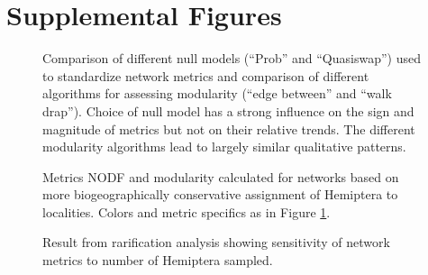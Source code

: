 % 
% 

\clearpage

\section*{Supplemental Figures}

\begin{figure}[!hp]
  \centering
  \caption[Comparison of different null models]{Comparison of
    different null models (``Prob'' and ``Quasiswap'') used to
    standardize network metrics and comparison of different algorithms
    for assessing modularity (``edge between'' and ``walk
    drap''). Choice of null model has a strong influence on the sign
    and magnitude of metrics but not on their relative trends. The
    different modularity algorithms lead to largely similar
    qualitative patterns.}
  \label{figSupp:netMetComp}
\end{figure}

\begin{figure}[!hp]
  \centering
  \caption[NODF and modularity for non-conservative networks]{Metrics
    NODF and modularity calculated for networks based on more
    biogeographically conservative assignment of Hemiptera to
    localities. Colors and metric specifics as in Figure
    \ref{figSupp:netMetComp}.}
  \label{figSupp:netCons}
\end{figure}

\begin{figure}[!hp]
  \centering
  \caption[Result from rarification analysis]{Result from rarification
    analysis showing sensitivity of network metrics to number of
    Hemiptera sampled.}
  \label{figSupp:rfy}
\end{figure}

